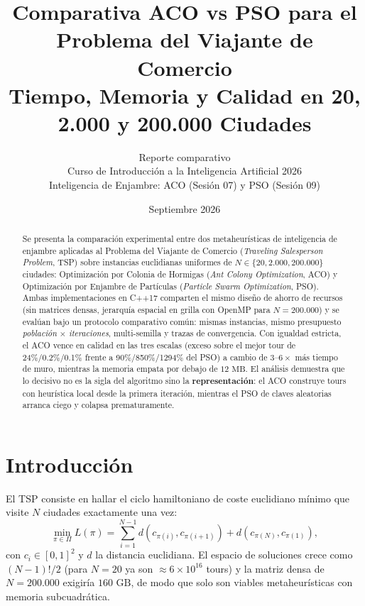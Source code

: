 \documentclass[11pt,a4paper]{article}
\title{Comparativa ACO vs PSO para el Problema del Viajante de Comercio\\ \large Tiempo, Memoria y Calidad en 20, 2.000 y 200.000 Ciudades}
\author{
  Reporte comparativo \\
  Curso de Introducción a la Inteligencia Artificial 2026 \\[0.4em]
  \small Inteligencia de Enjambre: ACO (Sesión 07) y PSO (Sesión 09)
}
\date{Septiembre 2026}
\begin{document}
\maketitle

\begin{abstract}
Se presenta la comparación experimental entre dos metaheurísticas de inteligencia de enjambre aplicadas al Problema del Viajante de Comercio (\emph{Traveling Salesperson Problem}, TSP) sobre instancias euclidianas uniformes de $N \in \{20, 2.000, 200.000\}$ ciudades: Optimización por Colonia de Hormigas (\emph{Ant Colony Optimization}, ACO) y Optimización por Enjambre de Partículas (\emph{Particle Swarm Optimization}, PSO). Ambas implementaciones en C++17 comparten el mismo diseño de ahorro de recursos (sin matrices densas, jerarquía espacial en grilla con OpenMP para $N=200.000$) y se evalúan bajo un protocolo comparativo común: mismas instancias, mismo presupuesto \textit{población} $\times$ \textit{iteraciones}, multi-semilla y trazas de convergencia. Con igualdad estricta, el ACO vence en calidad en las tres escalas (exceso sobre el mejor tour de 24\%/0.2\%/0.1\% frente a 90\%/850\%/1294\% del PSO) a cambio de $3$--$6\times$ más tiempo de muro, mientras la memoria empata por debajo de $12\text{ MB}$. El análisis demuestra que lo decisivo no es la sigla del algoritmo sino la \textbf{representación}: el ACO construye tours con heurística local desde la primera iteración, mientras el PSO de claves aleatorias arranca ciego y colapsa prematuramente.
\end{abstract}

\section{Introducción}
El TSP consiste en hallar el ciclo hamiltoniano de coste euclidiano mínimo que visite $N$ ciudades exactamente una vez:
\begin{equation}
    \min_{\pi \in \Pi} L(\pi) = \sum_{i=1}^{N-1} d(c_{\pi(i)}, c_{\pi(i+1)}) + d(c_{\pi(N)}, c_{\pi(1)}),
\end{equation}
con $c_i \in [0,1]^2$ y $d$ la distancia euclidiana. El espacio de soluciones crece como $(N-1)!/2$ (para $N=20$ ya son $\approx 6\times10^{16}$ tours) y la matriz densa de $N=200.000$ exigiría $160\text{ GB}$, de modo que solo son viables metaheurísticas con memoria subcuadrática.
\end{document}
